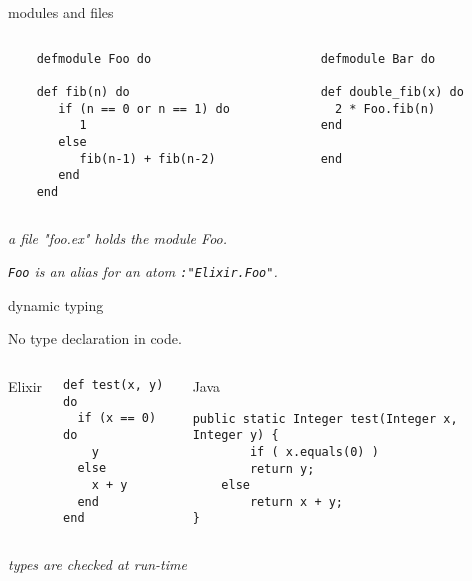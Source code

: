 \begin{frame}[fragile]{modules and files}

\begin{columns}[t]
\begin{column}{0.5\textwidth}
  \begin{lstlisting}
    defmodule Foo do
      
    def fib(n) do
       if (n == 0 or n == 1) do 
          1
       else
          fib(n-1) + fib(n-2) 
       end
    end
  \end{lstlisting}
\end{column} \pause
\begin{column}{0.5\textwidth}
  \begin{lstlisting}
  defmodule Bar do

  def double_fib(x) do
    2 * Foo.fib(n)
  end

  end
\end{lstlisting}
\end{column}
\end{columns}

\vspace{20pt}\pause
  {\em a file "foo.ex" holds the module Foo.} 
  
\vspace{20pt}\pause
  {\em {\tt Foo} is an alias for an atom {\tt :"Elixir.Foo"}.}
  
\end{frame}


\begin{frame}[fragile]{dynamic typing}

  No type declaration in code.

  \begin{columns}[t]
   Elixir 
   \begin{column}{0.5\textwidth}
    \begin{lstlisting}
def test(x, y) do
  if (x == 0) do
    y
  else 
    x + y
  end
end
     \end{lstlisting}
   \end{column}\pause
   \begin{column}{0.5\textwidth}
Java
    \begin{lstlisting}
public static Integer test(Integer x, Integer y) {
        if ( x.equals(0) )
	    return y;
	else 
	    return x + y;
}
     \end{lstlisting}
   \end{column}   
 \end{columns}


 \vspace{20pt}
{\em types are checked at run-time}
 
\end{frame}

